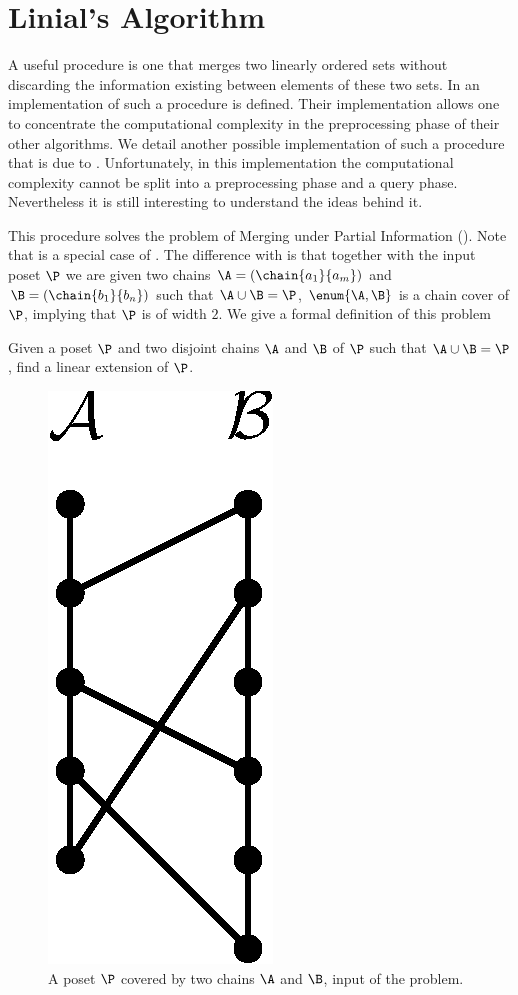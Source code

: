 \section{Linial's Algorithm}

A useful procedure is one that merges two linearly ordered sets without
discarding the information existing between elements of these two sets. In
\citet*{cardinal:2013} an implementation of such a procedure is defined. Their
implementation allows one to concentrate the computational complexity
in the preprocessing phase of their other algorithms.
We detail another possible implementation of such a procedure that is due
to \citet*{linial:1984}. Unfortunately, in this implementation the
computational complexity cannot be split into a preprocessing phase and a query
phase. Nevertheless it is still interesting to understand the ideas behind it.

This procedure solves the problem of Merging under Partial Information
(\MUPI). Note that \MUPI is a special case of \SUPI. The difference with
\SUPI is that together with the input poset \(\P\) we are given two chains \(\A
= (\chain{a_1}{a_m})\) and \(\B = (\chain{b_1}{b_n})\) such that \(\A \cup \B =
\P\), \ie \(\enum{\A,\B}\) is a chain cover of \(\P\), implying that \(\P\) is
of width \(2\). We give a formal definition of this problem
\begin{problem}
Given a poset \(\P\) and two disjoint chains \(\A\) and \(\B\) of \(\P\) such that \(\A \cup \B =
\P\), find a linear extension of \(\P\).
\end{problem}

\begin{figure}
\centering
\includegraphics[height=0.2\textheight]{fig/supi/mupi}
\caption{A poset \(\P\) covered by two chains \(\A\) and \(\B\),
input of the \MUPI problem.}
\label{fig:supi:mupi}
\end{figure}

